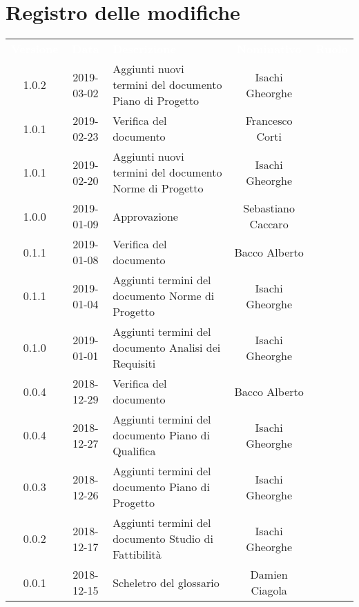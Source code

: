 
\section*{Registro delle modifiche}
{
	\renewcommand{\arraystretch}{1.5}
	\centering
	\begin{longtable}{ c c  C{4cm}  c  c }
		
		\textcolor{white}{\textbf{Versione}} & \textcolor{white}{\textbf{Data}} & \textcolor{white}{\textbf{Descrizione}} & \textcolor{white}{\textbf{Nominativo}} & \textcolor{white}{\textbf{Ruolo}}\\
		
		1.0.2 & 2019-03-02 & Aggiunti nuovi termini del documento Piano di Progetto & Isachi Gheorghe &\reda{}\\
		
		1.0.1 & 2019-02-23 & Verifica del documento &  Francesco Corti & \ver{}\\
		
		1.0.1 & 2019-02-20 & Aggiunti nuovi termini del documento Norme di Progetto & Isachi Gheorghe &\reda{}\\
		
		1.0.0 & 2019-01-09 & Approvazione & Sebastiano Caccaro & \Res{}\\
						
		0.1.1 & 2019-01-08 & Verifica del documento & Bacco Alberto & \ver{}\\
		
		0.1.1 & 2019-01-04 & Aggiunti termini del documento Norme di Progetto & Isachi Gheorghe &\reda{}\\
		
		0.1.0 & 2019-01-01 & Aggiunti termini del documento Analisi dei Requisiti & Isachi Gheorghe &\reda{}\\
		
		0.0.4 & 2018-12-29 & Verifica del documento & Bacco Alberto & \ver{}\\
				
		0.0.4 & 2018-12-27 & Aggiunti termini del documento Piano di Qualifica & Isachi Gheorghe &\reda{}\\
				
		0.0.3 & 2018-12-26 &Aggiunti termini del documento Piano di Progetto & Isachi Gheorghe & \reda{}\\
				
		0.0.2 & 2018-12-17 & Aggiunti termini del documento Studio di Fattibilità & Isachi Gheorghe &\reda{}\\
		
		0.0.1 & 2018-12-15 & Scheletro del glossario & Damien Ciagola & \reda{}\\
		
	\end{longtable}

}